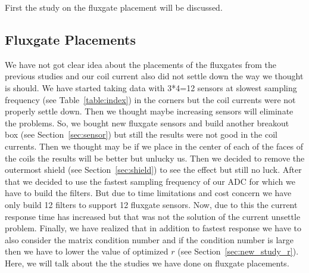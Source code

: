 First the study on the fluxgate placement will be discussed.

\subsection{Fluxgate Placements}

We have not got clear idea about the placements of the fluxgates from the previous studies and our coil current also did not settle down the way we thought is should. We have started taking data with 3*4=12 sensors at slowest sampling frequency (see Table~\ref{table:index}) in the corners but the coil currents were not properly settle down. Then we thought maybe increasing sensors will eliminate the problems. So, we bought new fluxgate sensors and build another breakout box (see Section~\ref{sec:sensor}) but still the results were not good in the coil currents. Then we thought may be if we place in the center of each of the faces of the coils the results will be better but unlucky us. Then we decided to remove the outermost shield (see Section~\ref{sec:shield}) to see the effect but still no luck. After that we decided to use the fastest sampling frequency of our ADC for which we have to build the filters. But due to time limitations and cost concern we have only build 12 filters to support 12 fluxgate sensors. Now, due to this the current response time has increased but that was not the solution of the current unsettle problem. Finally, we have realized that in addition to fastest response we have to also consider the matrix condition number and if the condition number is large then we have to lower the value of optimized $r$ (see Section~\ref{sec:new_study_r}). Here, we will talk about the the studies we have done on fluxgate placements.

